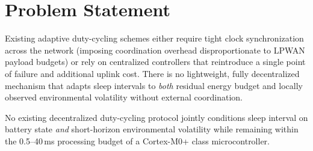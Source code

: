 \section{Problem Statement}
Existing adaptive duty-cycling schemes either require tight clock synchronization across the
network (imposing coordination overhead disproportionate to LPWAN payload budgets) or rely on
centralized controllers that reintroduce a single point of failure and additional uplink
cost. There is no lightweight, fully decentralized mechanism that adapts sleep intervals to
\emph{both} residual energy budget and locally observed environmental volatility without
external coordination.

\begin{infobox}[title={\faFile\ Research Gap}]
No existing decentralized duty-cycling protocol jointly conditions sleep interval on
battery state \emph{and} short-horizon environmental volatility while remaining within the
0.5--40\,ms processing budget of a Cortex-M0+ class microcontroller.
\end{infobox}
